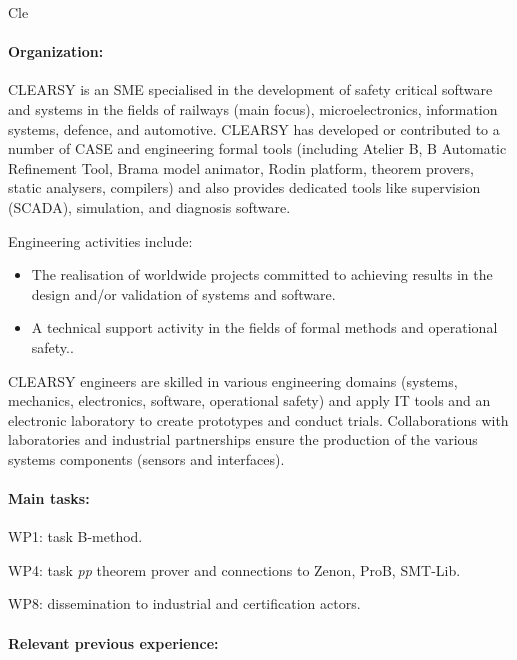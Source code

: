 \begin{sitedescription}{Cle}

\paragraph{Organization:}

CLEARSY is an SME specialised in the development of safety critical software and systems in the fields
of railways (main focus), microelectronics, information systems, defence, and automotive. CLEARSY
has developed or contributed to a number of CASE and engineering formal tools (including Atelier
B, B Automatic Refinement Tool, Brama model animator, Rodin platform, theorem provers, static
analysers, compilers) and also provides dedicated tools like supervision (SCADA), simulation, and
diagnosis software.

Engineering activities include:
\begin{itemize}
\item The realisation of worldwide projects committed to achieving results in the design and/or validation of systems and software.
\item A technical support activity in the fields of formal methods and operational safety..
\end{itemize}

CLEARSY engineers are skilled in various engineering domains (systems, mechanics, electronics, software,
operational safety) and apply IT tools and an electronic laboratory to create prototypes and
conduct trials. Collaborations with laboratories and industrial partnerships ensure the production of
the various systems components (sensors and interfaces).

\paragraph{Main tasks:}

\begin{compactitem}
\item WP1: task B-method.
\item WP4: task \emph{pp} theorem prover and connections to Zenon, ProB, SMT-Lib.
\item WP8: dissemination to industrial and certification actors.
\end{compactitem}

\paragraph{Relevant previous experience:}


\end{sitedescription}
